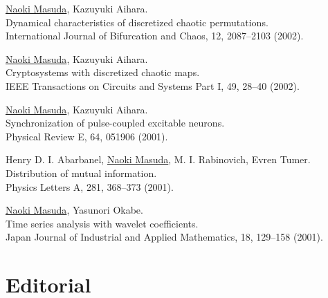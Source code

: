\documentclass[11pt,letter]{article}
\begin{document}
\begin{etaremune}
\item \underline{Naoki Masuda}, Kazuyuki Aihara.\\
Dynamical characteristics of discretized chaotic permutations.\\
International Journal of Bifurcation and Chaos, 12, 2087--2103 (2002).

\item \underline{Naoki Masuda}, Kazuyuki Aihara.\\
Cryptosystems with discretized chaotic maps.\\
IEEE Transactions on Circuits and Systems Part I, 49, 28--40 (2002).

\item \underline{Naoki Masuda}, Kazuyuki Aihara.\\
Synchronization of pulse-coupled excitable neurons.\\
Physical Review E, 64, 051906 (2001).

\item Henry D. I. Abarbanel, \underline{Naoki Masuda}, M. I. Rabinovich, Evren Tumer.\\
Distribution of mutual information.\\
Physics Letters A, 281, 368--373 (2001).

\item \underline{Naoki Masuda}, Yasunori Okabe.\\
Time series analysis with wavelet coefficients.\\
Japan Journal of Industrial and Applied Mathematics, 18, 129--158 (2001).



\end{etaremune}

\section*{\bf \normalsize Editorial}
\end{document}
